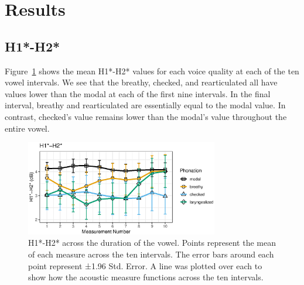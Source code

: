 \section{Results} \label{sec:Results}
\subsection{H1*-H2*} \label{sec:H1H2}

Figure~\ref{fig:FIG1} shows the mean H1*-H2* values for each voice quality at each of the ten vowel intervals. We see that the breathy, checked, and rearticulated all have values lower than the modal at each of the first nine intervals. In the final interval, breathy and rearticulated are essentially equal to the modal value. In contrast, checked's value remains lower than the modal's value throughout the entire vowel.

\begin{figure}[htbp]
  \centering
  \includegraphics[width = 0.75\textwidth]{images/Figure1.eps}
  \caption{\label{fig:FIG1}{H1*-H2* across the duration of the vowel. Points represent the mean of each measure across the ten intervals. The error bars around each point represent ±1.96 Std. Error. A line was plotted over each to show how the acoustic measure functions across the ten intervals.}}
\end{figure}

